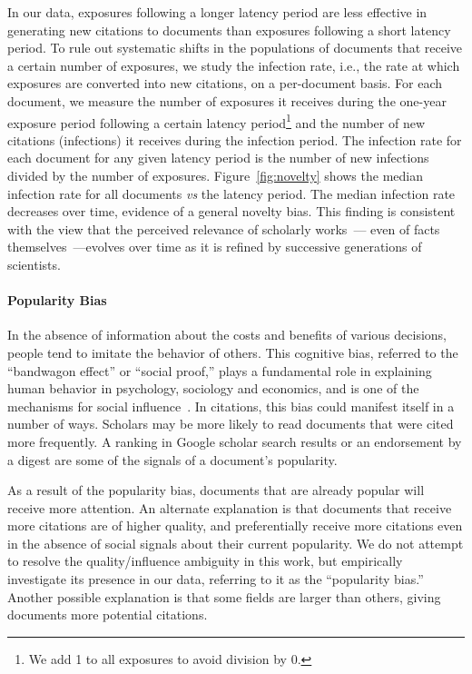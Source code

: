 \documentclass[10pt]{bmc_article}
\newenvironment{bmcformat}{\baselineskip20pt\sloppy\setboolean{publ}{false}}{\baselineskip20pt\sloppy}
\begin{document}
\begin{bmcformat}
In our data, exposures following a longer latency period are less effective in generating new citations to documents than exposures following a short latency period. To rule out systematic shifts in the populations of documents that receive a certain number of exposures, we study the infection rate, i.e., the rate at which exposures are converted into new citations, on a per-document basis. For each document, we measure the number of exposures it receives during the one-year exposure period following a certain latency period\footnote{We add 1 to all exposures to avoid division by 0.} and the number of new citations (infections) it receives during the infection period. The infection rate for each document for any given latency period is the number of new infections divided by the number of exposures. Figure~\ref{fig:novelty} shows the median infection rate for all documents \emph{vs} the latency period.%
The median infection rate decreases over time, evidence of a general novelty bias. %
This finding is consistent with the view that the perceived relevance of scholarly works~\cite{tang2008citation,Barabasi13}--- even of facts themselves~\cite{Arbesman12}---evolves over time as it is refined by successive generations of scientists.


\paragraph{Popularity Bias}%
In the absence of information about the costs and benefits of various decisions, people tend to imitate the behavior of others. This cognitive bias, referred to the ``bandwagon effect'' or ``social proof,'' plays a fundamental role in explaining human behavior in psychology, sociology and economics, and is one of the mechanisms for social influence~\cite{Aronson11}. In citations, this bias could manifest itself in a number of ways. Scholars may be more likely to read documents that were cited more frequently. A ranking in Google scholar search results or an endorsement by a digest are some of the signals of a document's popularity.

As a result of the popularity bias, documents that are already popular will receive more attention.  An alternate explanation is that documents that receive more citations are of higher quality, and preferentially receive more citations even in the absence of social signals about their current popularity. We do not attempt to resolve the quality/influence ambiguity in this work, but empirically investigate its presence in our data, referring to it as the ``popularity bias.'' Another possible explanation is that some fields are larger than others, giving documents more potential citations.


\end{bmcformat}
\end{document}
